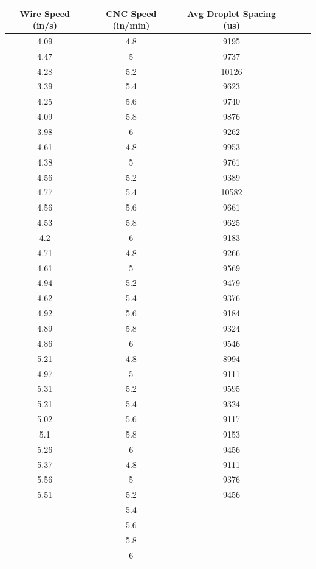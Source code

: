 \documentclass[12pt]{article}
\begin{document}
\begin{center}
\begin{tabular}{ |c|c|c|c|c|c| }
 
\end{tabular}


\end{center}

\clearpage


\begin{center}

\begin{tabular}{ |c|c|c|c|c|c| }


  \hline
  \textbf{Wire Speed (in/s)} & \textbf{CNC Speed (in/min)} & \textbf{Avg Droplet Spacing (us)} \\ \hline
  
4.09 &	4.8 &	9195 \\ \hline
4.47 &	5 &	9737 \\ \hline
4.28 &	5.2 &	10126 \\ \hline
3.39 &	5.4 &	9623 \\ \hline
4.25 &	5.6 &	9740 \\ \hline
4.09 &	5.8 &	9876 \\ \hline
3.98 &	6 &	9262 \\ \hline \hline
4.61 &	4.8 &	9953 \\ \hline
4.38 &	5 &	9761 \\ \hline
4.56 &	5.2 &	9389 \\ \hline
4.77 &	5.4 &	10582 \\ \hline
4.56 &	5.6 &	9661 \\ \hline
4.53 &	5.8 &	9625 \\ \hline
4.2 &	6 &	9183 \\ \hline \hline
4.71 &	4.8 &	9266 \\ \hline
4.61 &	5 &	9569 \\ \hline
4.94 &	5.2 &	9479 \\ \hline
4.62 &	5.4 &	9376 \\ \hline
4.92 &	5.6 &	9184 \\ \hline
4.89 &	5.8 &	9324 \\ \hline
4.86 &	6 &	9546 \\ \hline \hline
5.21 &	4.8 &	8994 \\ \hline
4.97 &	5 &	9111 \\ \hline
5.31 &	5.2 &	9595 \\ \hline
5.21 &	5.4 &	9324 \\ \hline
5.02 &	5.6 &	9117 \\ \hline
5.1 &	5.8 &	9153 \\ \hline
5.26 &	6 &	9456 \\ \hline \hline
5.37 &	4.8 &	9111 \\ \hline
5.56 &	5 &	9376 \\ \hline
5.51 &	5.2 &	9456 \\ \hline
	& 5.4	 & \\ \hline
	& 5.6 & \\ \hline	
	& 5.8 & \\ \hline	
	& 6 & \\ \hline	





\end{tabular}
\end{center}
\end{document}
